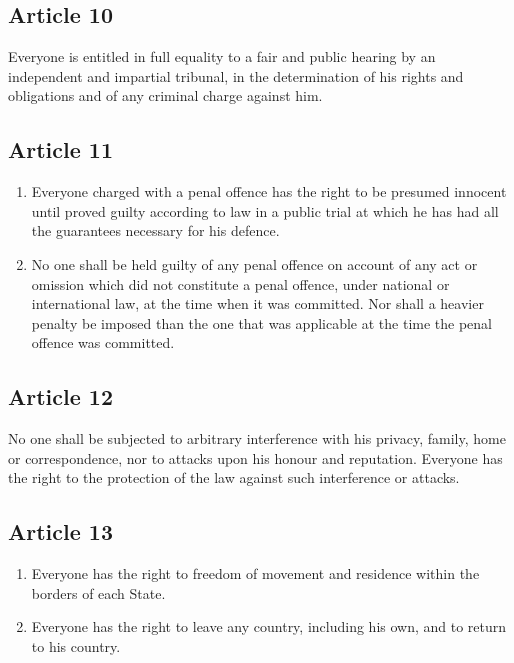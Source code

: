 \documentclass[
  titlepage,
  openright,
  DIV=calc,
  toc=listof,
  listof=nochaptergap]{scrbook}
\begin{document}
\hypertarget{article-10-1}{%
\subsection{Article 10}\label{article-10-1}}

Everyone is entitled in full equality to a fair and public hearing by an
independent and impartial tribunal, in the determination of his rights
and obligations and of any criminal charge against him.

\hypertarget{article-11-1}{%
\subsection{Article 11}\label{article-11-1}}

\begin{enumerate}
\def\labelenumi{\arabic{enumi}.}
\item
  Everyone charged with a penal offence has the right to be presumed
  innocent until proved guilty according to law in a public trial at
  which he has had all the guarantees necessary for his defence.
\item
  No one shall be held guilty of any penal offence on account of any act
  or omission which did not constitute a penal offence, under national
  or international law, at the time when it was committed. Nor shall a
  heavier penalty be imposed than the one that was applicable at the
  time the penal offence was committed.
\end{enumerate}

\hypertarget{article-12-1}{%
\subsection{Article 12}\label{article-12-1}}

No one shall be subjected to arbitrary interference with his privacy,
family, home or correspondence, nor to attacks upon his honour and
reputation. Everyone has the right to the protection of the law against
such interference or attacks.

\hypertarget{article-13-1}{%
\subsection{Article 13}\label{article-13-1}}

\begin{enumerate}
\def\labelenumi{\arabic{enumi}.}
\item
  Everyone has the right to freedom of movement and residence within the
  borders of each State.
\item
  Everyone has the right to leave any country, including his own, and to
  return to his country.
\end{enumerate}
\end{document}
